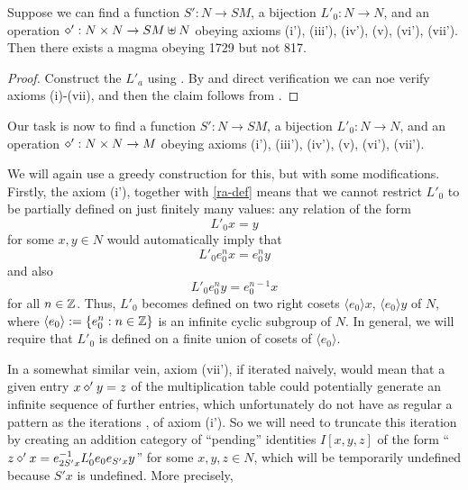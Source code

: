 \begin{lemma}\label{axiom-reduce}\label{Eq1729.reduce_to_new_axioms}\leanok  Suppose we can find a function $S': N \to SM$, a bijection $L'_0: N \to N$, and an operation $\diamond': N \times N \to SM \uplus N$ obeying axioms (i'), (iii'), (iv'), (v), (vi'), (vii').  Then there exists a magma obeying 1729 but not 817.
\end{lemma}

\begin{proof}  Construct the $L'_a$ using .  By  and direct verification we can noe verify axioms (i)-(vii), and then the claim follows from .
\end{proof}

Our task is now to find a function $S': N \to SM$, a bijection $L'_0: N \to N$, and an operation $\diamond': N \times N \to M$ obeying axioms (i'), (iii'), (iv'), (v), (vi'), (vii').

We will again use a greedy construction for this, but with some modifications.  Firstly, the axiom (i'), together with \eqref{ra-def} means that we cannot restrict $L'_0$ to be partially defined on just finitely many values: any relation of the form
$$ L'_0 x = y$$
for some $x,y \in N$ would automatically imply that
\begin{equation}\label{itero}
 L'_0 e_0^n x = e_0^n y
\end{equation}
and also
\begin{equation}\label{itero-2}
  L'_0 e_0^n y = e_0^{n-1} x
\end{equation}
for all $n \in \mathbb{Z}$.  Thus, $L'_0$ becomes defined on two right cosets $\langle e_0 \rangle x$, $\langle e_0 \rangle y$ of $N$, where $\langle e_0 \rangle := \{ e_0^n: n \in \mathbb{Z}\}$ is an infinite cyclic subgroup of $N$.  In general, we will require that $L'_0$ is defined on a finite union of cosets of $\langle e_0\rangle$.

In a somewhat similar vein, axiom (vii'), if iterated naively, would mean that a given entry $x \diamond' y = z$ of the multiplication table could potentially generate an infinite sequence of further entries, which unfortunately do not have as regular a pattern as the iterations ,  of axiom (i').  So we will need to truncate this iteration by creating an addition category of ``pending'' identities $I[x,y,z]$ of the form ``$z \diamond' x = e_{2S'x}^{-1} L'_0 e_0 e_{S'x} y$'' for some $x,y,z \in N$, which will be temporarily undefined because $S'x$ is undefined. More precisely,

